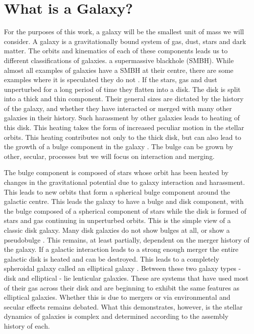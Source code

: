 \section{What is a Galaxy?}
\noindent For the purposes of this work, a galaxy will be the smallest unit of mass we will consider. A galaxy is a gravitationally bound system of gas, dust, stars and dark matter. The orbits and kinematics of each of these components leads us to different classifications of galaxies. \DIFdelbegin {}\DIFdelend \DIFaddbegin {}\DIFaddend a supermassive blackhole (SMBH)\DIFdelbegin {}\DIFdelend . While almost all examples of galaxies have a SMBH at their centre, there are some examples where it is speculated they do not \citep{2001AJ....122.2469G}. If the stars, gas and dust \DIFdelbegin {}\DIFdelend \DIFaddbegin {}\DIFaddend unperturbed for a long period of time they flatten into a disk. The disk is split into a thick and thin component. Their general sizes are dictated by the history of the galaxy, and whether they have interacted or merged with many other galaxies in their history. Such harassment by other galaxies leads to heating of this disk. This heating takes the form of increased peculiar motion in the stellar orbits. This heating contributes not only to the thick disk, but can also lead to the growth of a bulge component in the galaxy \citep{2010ApJ...715..202H, 2017ApJ...837L...8B}. The bulge can be grown by other, secular, processes but we will focus on interaction and merging.

The bulge component is composed of stars whose orbit has been heated by changes in the gravitational potential due to galaxy interaction and harassment. This leads to new orbits that form a spherical bulge component around the galactic centre. This leads the galaxy to have a bulge and disk component, with the bulge composed of a spherical component of stars while the disk is formed of stars and gas continuing in unperturbed orbits. This is the simple view of a classic disk galaxy. Many disk galaxies do not show bulges at all, or show a pseudobulge \citep{2009MNRAS.399..621G}. This remains, at least partially, dependent on the merger history of the galaxy. If a galactic interaction leads to a strong enough merger the entire galactic disk is heated and can be destroyed. This leads to a completely spheroidal galaxy called an elliptical galaxy \citep{1977egsp.conf..401T, 2006MNRAS.366..499D}. Between these two galaxy types - disk and elliptical - lie lenticular galaxies. These are systems that have used most of their gas across their disk and are beginning to exhibit the same features as elliptical galaxies. Whether this is due to mergers \citep{2004ApJ...616..192C, 2005ApJ...621..246B} or via environmental and secular effects \citep{2002MNRAS.330..251M, 2018MNRAS.476.2137R} remains debated. What this demonstrates, however, is the stellar dynamics of galaxies is complex and determined according to the assembly history of each.

